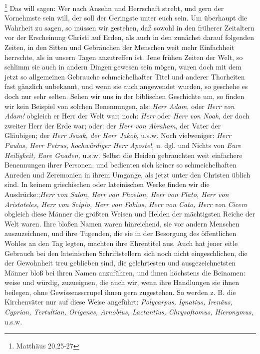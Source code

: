\footnote{Matthäus 20,25-27}
Das will sagen: Wer nach Ansehn und
Herrschaft strebt, und gern der Vornehmste sein will, der soll der Geringste
unter euch sein. Um überhaupt die Wahrheit zu sagen, so müssen wir gestehen, daß
sowohl in den früherer Zeitaltern vor der Erscheinung Christi auf Erden, als
auch in den zunächst darauf folgenden Zeiten, in den Sitten und Gebräuchen der
Menschen weit mehr Einfachheit herrschte, als in unsern Tagen anzutreffen ist.
Jene frühen Zeiten der Welt, so schlimm sie auch in andern Dingen gewesen sein
mögen, waren doch mit dem jetzt so allgemeinen Gebrauche schmeichelhafter Titel
und anderer Thorheiten fast gänzlich unbekannt, und wenn sie auch angewendet
wurden, so geschehe es doch nur sehr selten. Sehen wir uns in der biblischen
Geschichte um, so finden wir kein Beispiel von solchen Benennungen, als:
\textit{Herr
Adam}, oder \textit{Herr von Adam!} obgleich er Herr der Welt war; noch:
\textit{Herr} oder
\textit{Herr von Noah}, der doch zweiter Herr der Erde war; oder: der
\textit{Herr von Abraham},
der Vater der Gläubigen; der \textit{Herr Jsaak, der Herr Jakob}, u.s.w. Noch
vielweniger: \textit{Herr Paulus, Herr Petrus, hochwürdiger Herr Apostel,} u.
dgl. und
Nichts von \textit{Eure Heiligkeit, Eure Gnaden,} u.s.w. Selbst die Heiden
gebrauchten
weit einfachere Benennungen ihrer Personen, und bedienten sich keiner so
schmeichelhaften Anreden und Zeremonien in ihrem Umgange, als jetzt unter den
Christen üblich sind. In keinem griechischen oder lateinischen Werke finden wir
die Ausdrücke:;\textit{Herr von Salon, Herr von Phoeion, Herr von Plato, Herr
von
Aristoteles, Herr von Scipio, Herr von Fakius, Herr von Cato, Herr von Cicero}
obgleich diese Männer die größten Weisen und Helden der mächtigsten Reiche der
Welt waren. Ihre bloßen Namen waren hinreichend, sie vor andern Menschen
auszuzeichnen, und ihre Tugenden, die sie in der Besorgung des öffentlichen
Wohles an den Tag legten, machten ihre Ehrentitel aus. Auch hat jener eitle
Gebrauch bei den lateinischen Schriftstellern sich noch nicht eingeschlichen,
die der Gewohnheit treu geblieben sind, die gelehrtesten und ausgezeichnetsten
Männer bloß bei ihren Namen anzuführen, und ihnen höchstens die Beinamen: weise
und würdig, zuzueignen, die auch wir, wenn ihre Handlungen sie ihnen beilegen,
ohne Gewissensscrupel ihnen gern zugestehen. So werden z. B. die
Kirchenväter
nur auf diese Weise angeführt:
\textit{Polycarpus,
Ignatius, Irenäus,
Cyprian,
Tertultian, Origenes,
Arnobius, Lactantius,
Chrysoftomus,
Hieronymus,} u.s.w.
